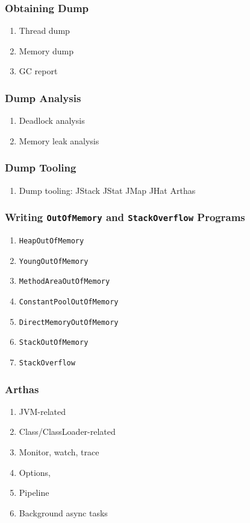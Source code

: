 \documentclass[11pt, twocolumn]{article}
\begin{document}
\subsubsection{Obtaining Dump}
\begin{enumerate}
	\item Thread dump
	\item Memory dump
	\item GC report
\end{enumerate}

\subsubsection{Dump Analysis}
\begin{enumerate}
	\item Deadlock analysis
	\item Memory leak analysis
\end{enumerate}

\subsubsection{Dump Tooling}
\begin{enumerate}
	\item Dump tooling:
	\subitem JStack
	\subitem JStat
	\subitem JMap
	\subitem JHat
	\subitem Arthas
\end{enumerate}

\subsubsection{Writing \texttt{OutOfMemory} and \texttt{StackOverflow} Programs}
\begin{enumerate}
	\item \texttt{HeapOutOfMemory}
	\item \texttt{YoungOutOfMemory}
	\item \texttt{MethodAreaOutOfMemory}
	\item \texttt{ConstantPoolOutOfMemory}
	\item \texttt{DirectMemoryOutOfMemory}
	\item \texttt{StackOutOfMemory}
	\item \texttt{StackOverflow}
\end{enumerate}

\subsubsection{Arthas}
\begin{enumerate}
	\item JVM-related
	\item Class/ClassLoader-related
	\item Monitor, watch, trace
	\item Options,
	\item Pipeline
	\item Background async tasks
\end{enumerate}
\end{document}
